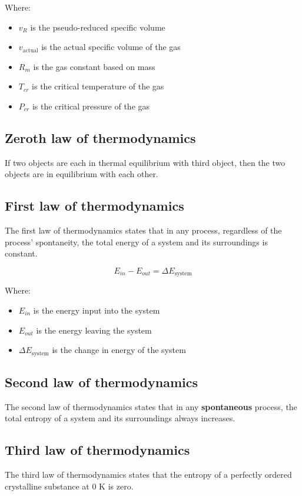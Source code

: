 \documentclass[11pt]{article}
\begin{document}
Where:
\begin{itemize}
\item \(v_R\) is the pseudo-reduced specific volume
\item \(v_{\text{actual}}\) is the actual specific volume of the gas
\item \(R_m\) is the gas constant based on mass
\item \(T_{cr}\) is the critical temperature of the gas
\item \(P_{cr}\) is the critical pressure of the gas
\end{itemize}

\subsection{Zeroth law of thermodynamics}
\label{sec:org0644605}
If two objects are each in thermal equilibrium with third object, then the two objects are in equilibrium with each other.

\subsection{First law of thermodynamics}
\label{sec:orgab0facf}
The first law of thermodynamics states that in any process, regardless of the process' spontaneity, the total energy of a system and its surroundings is constant.

\[E_{in} - E_{out} = \Delta E_{\text{system}}\]

Where:
\begin{itemize}
\item \(E_{in}\) is the energy input into the system
\item \(E_{out}\) is the energy leaving the system
\item \(\Delta E_{\text{system}}\) is the change in energy of the system
\end{itemize}

\subsection{Second law of thermodynamics}
\label{sec:orge2a0cd1}
The second law of thermodynamics states that in any \textbf{spontaneous} process, the total entropy of a system and its surroundings always increases.

\subsection{Third law of thermodynamics}
\label{sec:orge013d8e}
The third law of thermodynamics states that the entropy of a perfectly ordered crystalline substance at 0 K is zero.
\end{document}
